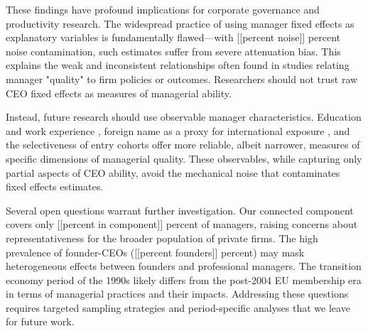 \documentclass[11pt,a4paper]{article}
\begin{document}
These findings have profound implications for corporate governance and productivity research. The widespread practice of using manager fixed effects as explanatory variables is fundamentally flawed—with [[percent noise]] percent noise contamination, such estimates suffer from severe attenuation bias. This explains the weak and inconsistent relationships often found in studies relating manager "quality" to firm policies or outcomes. Researchers should not trust raw CEO fixed effects as measures of managerial ability.

Instead, future research should use observable manager characteristics. Education and work experience \citep{DePirro2025}, foreign name as a proxy for international exposure \citep{Koren2023expat}, and the selectiveness of entry cohorts \citep{koren2024managers} offer more reliable, albeit narrower, measures of specific dimensions of managerial quality. These observables, while capturing only partial aspects of CEO ability, avoid the mechanical noise that contaminates fixed effects estimates.

Several open questions warrant further investigation. Our connected component covers only [[percent in component]] percent of managers, raising concerns about representativeness for the broader population of private firms. The high prevalence of founder-CEOs ([[percent founders]] percent) may mask heterogeneous effects between founders and professional managers. The transition economy period of the 1990s likely differs from the post-2004 EU membership era in terms of managerial practices and their impacts. Addressing these questions requires targeted sampling strategies and period-specific analyses that we leave for future work.
\end{document}
